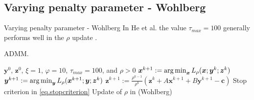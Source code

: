 \documentclass[8pt,red]{beamer}
\theoremstyle{plain}
\theoremstyle{definition}
\theoremstyle{remark}
\newcommand{\argmin}{\operatornamewithlimits{\mathrm{arg\,min}}}
\newcommand{\bi}[1]{\ensuremath{\boldsymbol{#1}}}
\begin{document}
\subsection{Varying penalty parameter - Wohlberg}
\begin{frame}{Varying penalty parameter - Wohlberg}
In He et al. the value $\tau_{max} = 100$ generally performs well in the $\rho$ update \citep{wohlberg2017admm}.

\begin{algorithm}[H]
  \scriptsize
  \caption{ADMM.}
  \label{alg:prototype.vp-N-Wohlberg}
  \begin{algorithmic}[1]
    \Require
    $\bi{y}^{0}$, $\bi{z}^{0}$, $\xi = 1$, $\varphi = 10$, $\tau_{max} = 100$, and $\rho > 0$ 
    \State
    $\bi{x}^{k+1} 
    := \argmin_{\bi{x}} L_{\rho}(\bi{x};{\bi{y}}^{k};{\bi{z}}^{k})$ 
    \State
    $\bi{y}^{k+1} 
    := \argmin_{\bi{y}} L_{\rho}(\bi{x}^{k+1};\bi{y};{\bi{z}}^{k})$ 
    \State
    $\bi{z}^{k+1} 
  := \frac{\rho^{k-1}}{\rho^{k}} \left( \bi{z}^{k} + A \bi{x}^{k+1} + B \bi{y}^{k+1} - \bi{c} \right)$ 
    \State
    Stop criterion in \eqref{eq.stopcriterion}
    \State
    Update of $\rho$ in (Wohlberg)
    \EndFor
  \end{algorithmic}
\end{algorithm}
\end{frame}
\end{document}
